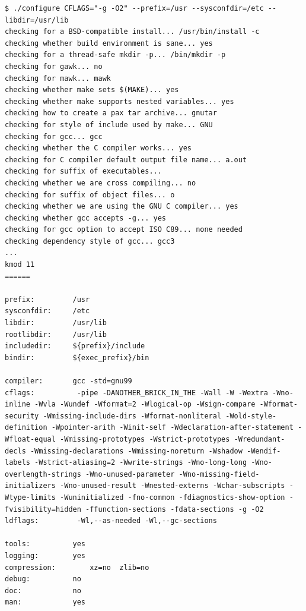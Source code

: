 {\begin{shaded}\begin{verbatim}
$ ./configure CFLAGS="-g -O2" --prefix=/usr --sysconfdir=/etc --libdir=/usr/lib
checking for a BSD-compatible install... /usr/bin/install -c
checking whether build environment is sane... yes
checking for a thread-safe mkdir -p... /bin/mkdir -p
checking for gawk... no
checking for mawk... mawk
checking whether make sets $(MAKE)... yes
checking whether make supports nested variables... yes
checking how to create a pax tar archive... gnutar
checking for style of include used by make... GNU
checking for gcc... gcc
checking whether the C compiler works... yes
checking for C compiler default output file name... a.out
checking for suffix of executables... 
checking whether we are cross compiling... no
checking for suffix of object files... o
checking whether we are using the GNU C compiler... yes
checking whether gcc accepts -g... yes
checking for gcc option to accept ISO C89... none needed
checking dependency style of gcc... gcc3
...
kmod 11
======

prefix:         /usr
sysconfdir:     /etc
libdir:         /usr/lib
rootlibdir:     /usr/lib
includedir:     ${prefix}/include
bindir:         ${exec_prefix}/bin

compiler:       gcc -std=gnu99
cflags:          -pipe -DANOTHER_BRICK_IN_THE -Wall -W -Wextra -Wno-inline -Wvla -Wundef -Wformat=2 -Wlogical-op -Wsign-compare -Wformat-security -Wmissing-include-dirs -Wformat-nonliteral -Wold-style-definition -Wpointer-arith -Winit-self -Wdeclaration-after-statement -Wfloat-equal -Wmissing-prototypes -Wstrict-prototypes -Wredundant-decls -Wmissing-declarations -Wmissing-noreturn -Wshadow -Wendif-labels -Wstrict-aliasing=2 -Wwrite-strings -Wno-long-long -Wno-overlength-strings -Wno-unused-parameter -Wno-missing-field-initializers -Wno-unused-result -Wnested-externs -Wchar-subscripts -Wtype-limits -Wuninitialized -fno-common -fdiagnostics-show-option -fvisibility=hidden -ffunction-sections -fdata-sections -g -O2
ldflags:         -Wl,--as-needed -Wl,--gc-sections 

tools:          yes
logging:        yes
compression:        xz=no  zlib=no
debug:          no
doc:            no
man:            yes
\end{verbatim}\end{shaded}}
